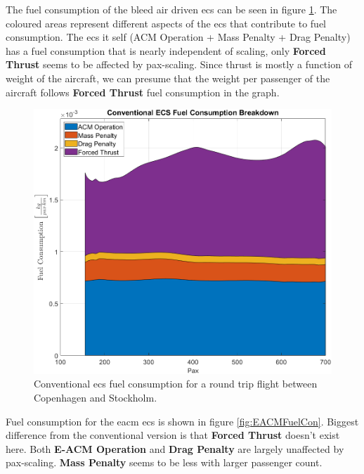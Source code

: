 \documentclass[english]{kththesis}
\begin{document}
The fuel consumption of the bleed air driven \acrshort{ecs} can be seen in figure \ref{fig:ACMFuelCon}. The coloured areas represent different aspects of the \acrshort{ecs} that contribute to fuel consumption. The \acrshort{ecs} it self (ACM Operation + Mass Penalty + Drag Penalty) has a fuel consumption that is nearly independent of scaling, only \textbf{Forced Thrust} seems to be affected by pax-scaling. Since thrust is mostly a function of weight of the aircraft, we can presume that the weight per passenger of the aircraft follows \textbf{Forced Thrust} fuel consumption in the graph.

\begin{figure}[!ht]
    \centering
    \includegraphics[width=1\textwidth]{Epictures/ACMECSfuelCon.png}
    \caption{Conventional \acrshort{ecs} fuel consumption for a round trip flight between Copenhagen and Stockholm.}
    \label{fig:ACMFuelCon}
\end{figure}

\clearpage

Fuel consumption for the \acrshort{eacm} \acrshort{ecs} is shown in figure \ref{fig:EACMFuelCon}. Biggest difference from the conventional version is that \textbf{Forced Thrust} doesn't exist here. Both \textbf{E-ACM Operation} and \textbf{Drag Penalty} are largely unaffected by pax-scaling. \textbf{Mass Penalty} seems to be less with larger passenger count.
\end{document}
